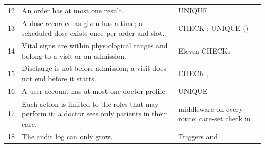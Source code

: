 {\begin{longtable}{@{}R{0.5cm}R{8.2cm}R{7.6cm}@{}}
12 & An order has at most one result. & UNIQUE  \\
13 & A dose recorded as given has a time; a scheduled dose exists once per order and slot. & CHECK ; UNIQUE () \\
14 & Vital signs are within physiological ranges and belong to a visit or an admission. & Eleven CHECKs  \\
15 & Discharge is not before admission; a visit does not end before it starts. & CHECK ,  \\
16 & A user account has at most one doctor profile. & UNIQUE  \\
17 & Each action is limited to the roles that may perform it; a doctor sees only patients in their care. &  middleware on every route; care-set check in  \\
18 & The audit log can only grow. & Triggers  and  \\
\bottomrule
\end{longtable}}
